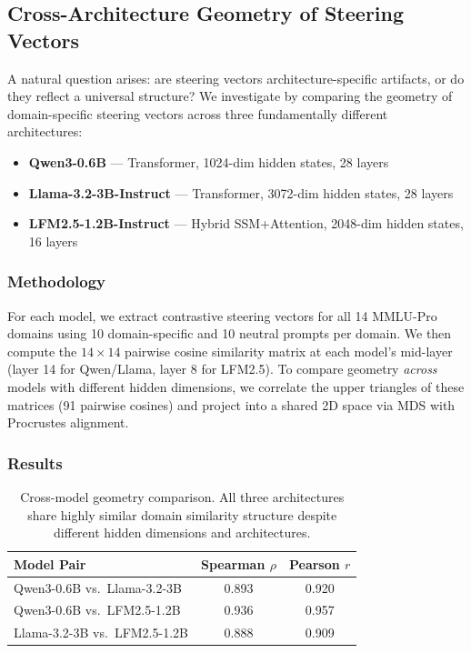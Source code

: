 \documentclass[11pt,a4paper]{article}
\begin{document}
\subsection{Cross-Architecture Geometry of Steering Vectors}
\label{sec:cross_architecture}

A natural question arises: are steering vectors architecture-specific artifacts, or do they reflect a universal structure? We investigate by comparing the geometry of domain-specific steering vectors across three fundamentally different architectures:
\begin{itemize}
    \item \textbf{Qwen3-0.6B} --- Transformer, 1024-dim hidden states, 28 layers
    \item \textbf{Llama-3.2-3B-Instruct} --- Transformer, 3072-dim hidden states, 28 layers
    \item \textbf{LFM2.5-1.2B-Instruct} --- Hybrid SSM+Attention, 2048-dim hidden states, 16 layers
\end{itemize}

\subsubsection{Methodology}

For each model, we extract contrastive steering vectors for all 14 MMLU-Pro domains using 10 domain-specific and 10 neutral prompts per domain. We then compute the $14 \times 14$ pairwise cosine similarity matrix at each model's mid-layer (layer 14 for Qwen/Llama, layer 8 for LFM2.5). To compare geometry \textit{across} models with different hidden dimensions, we correlate the upper triangles of these matrices (91 pairwise cosines) and project into a shared 2D space via MDS with Procrustes alignment.

\subsubsection{Results}

\begin{table}[H]
\centering
\caption{Cross-model geometry comparison. All three architectures share highly similar domain similarity structure despite different hidden dimensions and architectures.}
\label{tab:cross_model_geometry}
\small
\begin{tabular}{lcc}
\toprule
\textbf{Model Pair} & \textbf{Spearman $\rho$} & \textbf{Pearson $r$} \\
\midrule
Qwen3-0.6B vs.\ Llama-3.2-3B & 0.893 & 0.920 \\
Qwen3-0.6B vs.\ LFM2.5-1.2B & 0.936 & 0.957 \\
Llama-3.2-3B vs.\ LFM2.5-1.2B & 0.888 & 0.909 \\
\bottomrule
\end{tabular}
\end{table}
\end{document}
